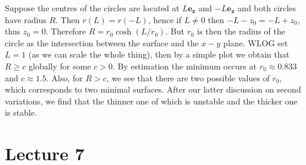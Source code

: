 \documentclass{article}
\begin{document}
\begin{example}
    Suppose the centres of the circles are located at $L\mathbf{e_z}$ and $-L\mathbf{e_z}$ and both circles have radius $R$.
    Then $r(L)=r(-L)$, hence if $L\neq 0$ then $-L-z_0=-L+z_0$, thus $z_0=0$.
    Therefore $R=r_0\cosh(L/r_0)$.
    But $r_0$ is then the radius of the circle as the intersection between the surface and the $x-y$ plane.
    WLOG set $L=1$ (as we can scale the whole thing), then by a simple plot we obtain that $R\ge c$ globally for some $c>0$.
    By estimation the minimum occurs at $r_0\approx 0.833$ and $c\approx 1.5$.
    Also, for $R>c$, we see that there are two possible values of $r_0$, which corresponds to two minimal surfaces.
    After our latter discussion on second variations, we find that the thinner one of which is unstable and the thicker one is stable.
\end{example}

\newpage
\part*{Lecture 7}
\end{document}
